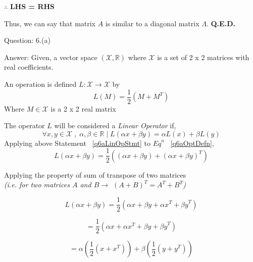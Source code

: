 \documentclass[a4paper]{article}
\begin{document}
\begin{qalist}
			$\therefore$ \textbf{LHS = RHS}
			
			Thus, we can say that matrix $A$ is similar to a diagonal matrix $\Lambda$.
			\textbf{Q.E.D.}
			
		\item[Question: 6.(a)] \setcounter{equation}{0} 
		\item[Answer:] Given, a vector space $(\mathcal{X}, \mathbb{R})$ where $\mathcal{X}$ is a set of 2 x 2 matrices with real coefficients.
		
		An operation is defined $L : \mathcal{X} \rightarrow \mathcal{X}$ by 
		\begin{equation}\label{q6aOptDefn}
			L(M) = \frac{1}{2} (M + {M}^{T})
		\end{equation}
		Where $M \in \mathcal{X}$ is a 2 x 2 real matrix
		
		The operator $L$ will be considered a \textit{Linear Operator} if, 
		\begin{equation}\label{q6aLinOpStmt}
			\forall x,y \in \mathcal{X} \;,\; \alpha, \beta \in \mathbb{R}\;|\;L(\alpha x + \beta y) = \alpha L(x) + \beta L(y)
		\end{equation}
		Applying above Statement ~\ref{q6aLinOpStmt} to ${Eq}^{n}$ ~\ref{q6aOptDefn},
		\begin{equation}\label{q6aPrfStart}
			L(\alpha x + \beta y) = \frac{1}{2}((\alpha x + \beta y) + {(\alpha x + \beta y)}^{T})
		\end{equation}
		
		Applying the property of sum of transpose of two matrices \\ \textit{(i.e. for two matrices $A$ and $B \rightarrow$ ${(A+B)}^{T} = {A}^{T} + {B}^{T}$)}
		
		\begin{equation}\label{q6aPrfTranspose}
			L(\alpha x + \beta y) = \frac{1}{2}(\alpha x + \beta y + {\alpha x}^{T} + {\beta y}^{T})
		\end{equation}
		
		\begin{equation}\label{q6aPrfRearrange}
			= \frac{1}{2}(\alpha x + {\alpha x}^{T} + \beta y  + {\beta y}^{T})
		\end{equation}
		
		\begin{equation}\label{q6aPrfTakingCommon}
			= \alpha (\frac{1}{2}(x + {x}^{T})) + \beta(\frac{1}{2}(y  + {y}^{T}))
		\end{equation}
		

\end{qalist}
\end{document}
